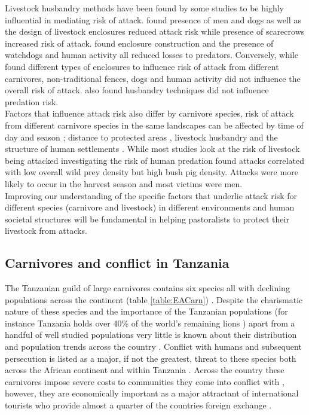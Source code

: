 Livestock husbandry methods have been found by some studies to be highly influential in mediating risk of attack. \citet{Woodroffe2007} found presence of men and dogs as well as the design of livestock enclosures reduced attack risk while presence of scarecrows increased risk of attack. \citet{Ogada2003} found enclosure construction and the presence of watchdogs and human activity all reduced losses to predators. Conversely, while \citet{Kolowski2006} found different types of enclosures to influence risk of attack from different carnivores, non-traditional fences, dogs and human activity did not influence the overall risk of attack. \citet{Abade2014h} also found husbandry techniques did not influence predation risk.\\

Factors that influence attack risk also differ by carnivore species, risk of attack from different carnivore species in the same landscapes can be affected by time of day and season \citep{Kissui2008}; distance to protected areas \citep{Holmern2007a}, livestock husbandry \citep{Woodroffe2007,Kolowski2006} and the structure of human settlements \citep{Kolowski2006}. While most studies look at the risk of livestock being attacked \citet{Packer2005} investigating the risk of human predation found attacks correlated with low overall wild prey density but high bush pig density. Attacks were more likely to occur in the harvest season and most victims were men.\\

Improving our understanding of the specific factors that underlie attack risk for different species (carnivore and livestock) in different environments and human societal structures will be fundamental in helping pastoralists to protect their livestock from attacks.\\

\subsection{Carnivores and conflict in Tanzania}

The Tanzanian guild of large carnivores contains six species all with declining populations across the continent (table \ref{table:EACarn}) \citep{Winterbach2013}. Despite the charismatic nature of these species and the importance of the Tanzanian populations (for instance Tanzania holds over 40\% of the world's remaining lions \citep{Riggio2013}) apart from a handful of well studied populations very little is known about their distribution and population trends across the country \citep{TAWIRI2009}. Conflict with humans and subsequent persecution is listed as a major, if not the greatest, threat to these species both across the African continent and within Tanzania \citep{IUCN2016,Ray2005,TAWIRI2009}. Across the country these carnivores impose severe costs to communities they come into conflict with \citep{Packer2005,Dickman2008,Kissui2008}, however, they are economically important as a major attractant of international tourists who provide almost a quarter of the countries foreign exchange \citep{Bank2015}. 
\\

